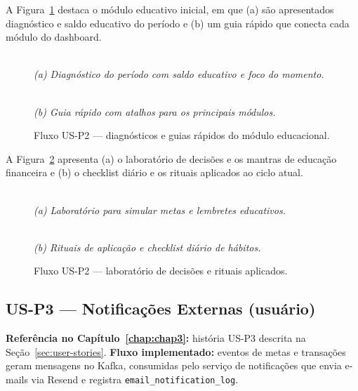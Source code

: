 A Figura~\ref{fig:us-p2} destaca o módulo educativo inicial, em que (a) são apresentados diagnóstico e saldo educativo do período e (b) um guia rápido que conecta cada módulo do dashboard.

\begin{figure}[!htbp]
\centering
{}\\
\smallskip
\textit{(a) Diagnóstico do período com saldo educativo e foco do momento.}

\par\medskip

\\
\smallskip
\textit{(b) Guia rápido com atalhos para os principais módulos.}
\caption{Fluxo US-P2 — diagnósticos e guias rápidos do módulo educacional.}
\label{fig:us-p2}
\end{figure}

A Figura~\ref{fig:us-p2b} apresenta (a) o laboratório de decisões e os mantras de educação financeira e (b) o checklist diário e os rituais aplicados ao ciclo atual.

\begin{figure}[!htbp]
\centering
{}\\
\smallskip
\textit{(a) Laboratório para simular metas e lembretes educativos.}

\par\medskip

\\
\smallskip
\textit{(b) Rituais de aplicação e checklist diário de hábitos.}
\caption{Fluxo US-P2 — laboratório de decisões e rituais aplicados.}
\label{fig:us-p2b}
\end{figure}

\FloatBarrier

\subsection{US-P3 — Notificações Externas (usuário)}
\textbf{Referência no Capítulo~\ref{chap:chap3}:} história US-P3 descrita na Seção~\ref{sec:user-stories}.
\textbf{Fluxo implementado:} eventos de metas e transações geram mensagens no Kafka, consumidas pelo serviço de notificações que envia e-mails via Resend e registra \texttt{email\_notification\_log}.

